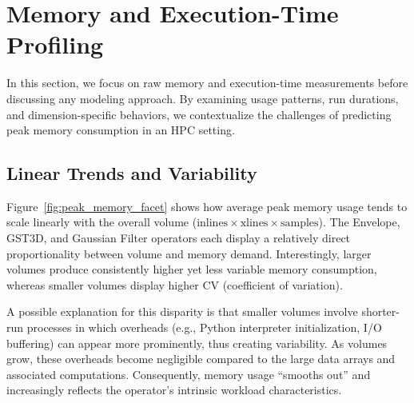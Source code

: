 \section{Memory and Execution-Time Profiling}
\label{sec:pmc-results-memory-and-execution-time-profiling}

In this section, we focus on raw memory and execution-time measurements before discussing any modeling approach.
By examining usage patterns, run durations, and dimension-specific behaviors, we contextualize the challenges of predicting peak memory consumption in an \ac{HPC} setting.

\subsection{Linear Trends and Variability}
\label{subsec:linear-trends-and-variability}

Figure~\ref{fig:peak_memory_facet} shows how average peak memory usage tends to scale linearly with the overall volume (\(\text{inlines} \times \text{xlines} \times \text{samples}\)). The Envelope, \ac{GST3D}, and Gaussian Filter operators each display a relatively direct proportionality between volume and memory demand.
Interestingly, larger volumes produce consistently higher yet less variable memory consumption, whereas smaller volumes display higher \ac{CV} (coefficient of variation).

A possible explanation for this disparity is that smaller volumes involve shorter-run processes in which overheads (e.g., Python interpreter initialization, I/O buffering) can appear more prominently, thus creating variability.
As volumes grow, these overheads become negligible compared to the large data arrays and associated computations.
Consequently, memory usage “smooths out” and increasingly reflects the operator’s intrinsic workload characteristics.

